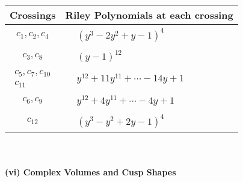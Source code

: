 \documentclass[1p]{elsarticle_modified}
\theoremstyle{definition}
\begin{document}
\begin{tabular}{m{50pt}|m{274pt}}
Crossings & \hspace{64pt}Riley Polynomials at each crossing \\
\hline $$\begin{aligned}c_{1},c_{2},c_{4}\end{aligned}$$&$\begin{aligned}
&(y^3-2 y^2+y-1)^4
\end{aligned}$\\
\hline $$\begin{aligned}c_{3},c_{8}\end{aligned}$$&$\begin{aligned}
&(y-1)^{12}
\end{aligned}$\\
\hline $$\begin{aligned}c_{5},c_{7},c_{10}\\c_{11}\end{aligned}$$&$\begin{aligned}
&y^{12}+11 y^{11}+\cdots-14 y+1
\end{aligned}$\\
\hline $$\begin{aligned}c_{6},c_{9}\end{aligned}$$&$\begin{aligned}
&y^{12}+4 y^{11}+\cdots-4 y+1
\end{aligned}$\\
\hline $$\begin{aligned}c_{12}\end{aligned}$$&$\begin{aligned}
&(y^3- y^2+2 y-1)^4
\end{aligned}$\\
\hline
\end{tabular}\\~\\
\newpage\flushleft \textbf{(vi) Complex Volumes and Cusp Shapes}
\end{document}
